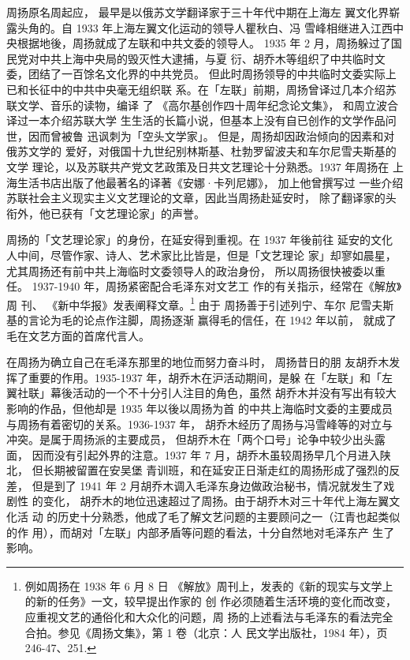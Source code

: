 周扬原名周起应，
最早是以俄苏文学翻译家于三十年代中期在上海左
翼文化界崭露头角的。自 1933 年上海左翼文化运动的领导人瞿秋白、冯
雪峰相继进入江西中央根据地後，周扬就成了左联和中共文委的领导人。
1935 年 2 月，周扬躲过了国民党对中共上海中央局的毁灭性大逮捕，与夏
衍、胡乔木等组织了中共临时文委，团结了一百馀名文化界的中共党员。
但此时周扬领导的中共临时文委实际上已和长征中的中共中央毫无组织联
系。在「左联」前期，周扬曾译过几本介绍苏联文学、音乐的读物，编译
了
《高尔基创作四十周年纪念论文集》， 和周立波合译过一本介绍苏联大学
生生活的长篇小说，但基本上没有自已创作的文学作品问世，因而曾被鲁
迅讽刺为「空头文学家」。
但是，周扬却因政治倾向的因素和对俄苏文学的
爱好，对俄国十九世纪别林斯基、杜勃罗留波夫和车尔尼雪夫斯基的文学
理论，以及苏联共产党文艺政策及日共文艺理论十分熟悉。1937 年周扬在
上海生活书店出版了他最著名的译著《安娜·卡列尼娜》，
加上他曾撰写过
一些介绍苏联社会主义现实主义文艺理论的文章，因此当周扬赴延安时，
除了翻译家的头衔外，他已获有「文艺理论家」的声誉。

周扬的「文艺理论家」的身份，在延安得到重视。在 1937 年後前往 延安的文化
人中间，尽管作家、诗人、艺术家比比皆是，但是「文艺理论 家」却寥如晨星，
尤其周扬还有前中共上海临时文委领导人的政治身份， 所以周扬很快被委以重任。
1937-1940 年，周扬紧密配合毛泽东对文艺工 作的有关指示，经常在《解放》周
刊、 《新中华报》发表阐释文章。\footnote{例如周扬在 1938 年 6 月 8 日
《解放》周刊上，发表的《新的现实与文学上的新的任务》一文，较早提出作家的
创 作必须随着生活环境的变化而改变，应重视文艺的通俗化和大众化的问题，周
扬的上述看法与毛泽东的看法完全合拍。参见《周扬文集》，第 1 卷（北京：人
民文学出版社，1984 年），页 246-47、251.  } 由于 周扬善于引述列宁、车尔
尼雪夫斯基的言论为毛的论点作注脚，周扬逐渐 赢得毛的信任，在 1942 年以前，
就成了毛在文艺方面的首席代言人。

在周扬为确立自己在毛泽东那里的地位而努力奋斗时， 周扬昔日的朋 友胡乔木发
挥了重要的作用。1935-1937 年，胡乔木在沪活动期间，是躲 在「左联」和「左
翼社联」幕後活动的一个不十分引人注目的角色，虽然 胡乔木并没有写出有较大
影响的作品，但他却是 1935 年以後以周扬为首 的中共上海临时文委的主要成员
与周扬有着密切的关系。1936-1937 年， 胡乔木经历了周扬与冯雪峰等的对立与
冲突。是属于周扬派的主要成员， 但胡乔木在「两个口号」论争中较少出头露面，
因而没有引起外界的注意。1937 年 7 月，胡乔木虽较周扬早几个月进入陕北，
但长期被留置在安吴堡 青训班，和在延安正日渐走红的周扬形成了强烈的反差，
但是到了 1941 年 2 月胡乔木调入毛泽东身边做政治秘书，情况就发生了戏剧性
的变化， 胡乔木的地位迅速超过了周扬。由于胡乔木对三十年代上海左翼文化活
动 的历史十分熟悉，他成了毛了解文艺问题的主要顾问之一（江青也起类似 的作
用），而胡对「左联」内部矛盾等问题的看法，十分自然地对毛泽东产 生了影响。

